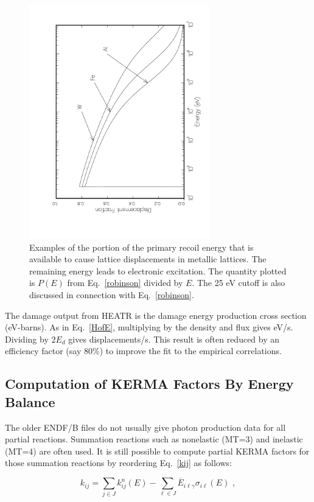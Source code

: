 \begin{figure}[t]\centering
\includegraphics[height=4.0in, angle=270]{figs/heatr2ack}
\caption[Sample recoil energy and lattice displacement data]
  {Examples of the portion of the primary recoil
  energy that is available to cause lattice displacements in
  metallic lattices.  The remaining energy leads to electronic
  excitation.  The quantity plotted is $P(E)$ from
  Eq.~\ref{robinson} divided by $E$.  The 25 eV cutoff
  is also discussed in connection with Eq.~\ref{robinson}.}
\label{f2}
\end{figure}

The damage output from HEATR is the damage energy production
cross section (eV-barns).  As in Eq.~\ref{HofE}, multiplying by
the density and flux gives eV/s.  Dividing by $2E_d$ gives
displacements/s.  This result is often reduced by an efficiency
factor (say 80\%) to improve the fit to the empirical correlations.


\subsection{Computation of KERMA Factors By Energy Balance}
\label{ssHEATR_KERMA}

The older ENDF/B files do not usually give photon production data for
all partial reactions.  Summation reactions such as nonelastic
(MT=3) and inelastic (MT=4) are often used.  It is still possible
to compute partial KERMA factors for those summation reactions by
reordering Eq.~\ref{kij} as follows:

\begin{equation}
   k_{ij}=\sum_{j\in J}k_{ij}^n(E)-\sum_{\ell\in J}
    \overline{E}_{i\ell\gamma}\sigma_{i\ell}(E)\,\,,
\label{reordered}
\end{equation}
\vspace{0.5 pt}

